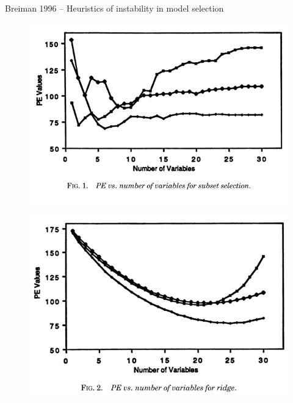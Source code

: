 \documentclass{beamer}
\begin{document}
\begin{frame}{Breiman 1996 -- Heuristics of instability in model selection}
\begin{figure}
\includegraphics[scale=0.25]{Breiman_1996_PE_error_versus_number_of_variables.png}
\end{figure}

\begin{figure}
\includegraphics[scale=0.25]{Breiman_1996_PE_error_versus_number_of_variables_ridge.png}
\end{figure}
\end{frame}
\end{document}
